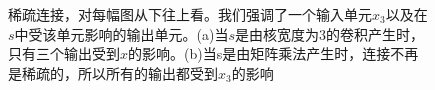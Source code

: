 \documentclass[12pt,a4paper,titlepage]{article}
\begin{document}
\begin{figure}[htbp] %

\centering




\caption{稀疏连接，对每幅图从下往上看。我们强调了一个输入单元$x_3$以及在$s$中受该单元影响的输出单元。(a)当$s$是由核宽度为3的卷积产生时，只有三个输出受到$x$的影响。(b)当s是由矩阵乘法产生时，连接不再是稀疏的，所以所有的输出都受到$x_3$的影响}
\label{fig:sparse_dense}
\end{figure}
\end{document}

